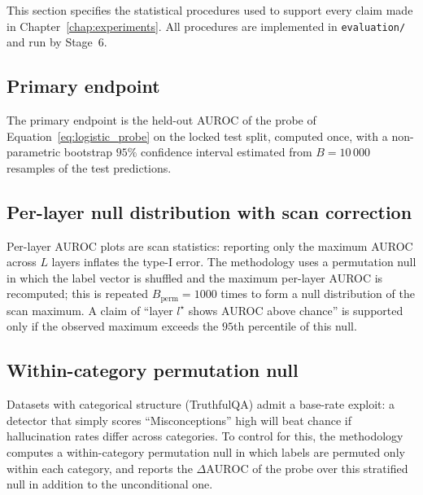 This section specifies the statistical procedures used to support every
claim made in Chapter~\ref{chap:experiments}. All procedures are
implemented in \texttt{evaluation/} and run by Stage~6.

\subsection{Primary endpoint}
\label{subsec:primary_endpoint}

The primary endpoint is the held-out AUROC of the probe of
Equation~\eqref{eq:logistic_probe} on the locked test split, computed
once, with a non-parametric bootstrap $95\%$ confidence interval
estimated from $B = 10\,000$ resamples of the test predictions.

\subsection{Per-layer null distribution with scan correction}
\label{subsec:scan_correction}

Per-layer AUROC plots are scan statistics: reporting only the maximum
AUROC across $L$ layers inflates the type-I error. The methodology uses
a permutation null in which the label vector is shuffled and the maximum
per-layer AUROC is recomputed; this is repeated $B_{\mathrm{perm}} =
1000$ times to form a null distribution of the scan maximum. A claim of
``layer $l^\star$ shows AUROC above chance'' is supported only if the
observed maximum exceeds the $95$th percentile of this null.

\subsection{Within-category permutation null}
\label{subsec:within_category_null}

Datasets with categorical structure (TruthfulQA) admit a base-rate
exploit: a detector that simply scores ``Misconceptions'' high will beat
chance if hallucination rates differ across categories. To control for
this, the methodology computes a within-category permutation null in
which labels are permuted only within each category, and reports the
$\Delta\mathrm{AUROC}$ of the probe over this stratified null in
addition to the unconditional one.

